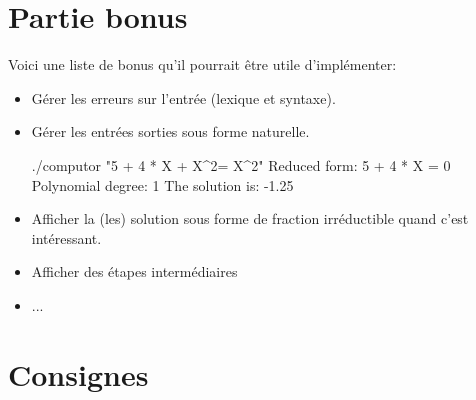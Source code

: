 \documentclass{42}
\begin{document}
\chapter{Partie bonus}

    Voici une liste de bonus qu'il pourrait être utile d'implémenter:\\

    \begin{itemize}

        \item Gérer les erreurs sur l'entrée (lexique et syntaxe).

	    \item Gérer les entrées sorties sous forme naturelle.
        \begin{42console}
./computor "5 + 4 * X + X^2= X^2"
Reduced form: 5 + 4 * X = 0
Polynomial degree: 1
The solution is:
-1.25\end{42console}

        \item Afficher la (les) solution sous forme de fraction
          irréductible quand c'est intéressant.

	    \item Afficher des étapes intermédiaires

	    \item ...

    \end{itemize}


\chapter{Consignes}
\end{document}
